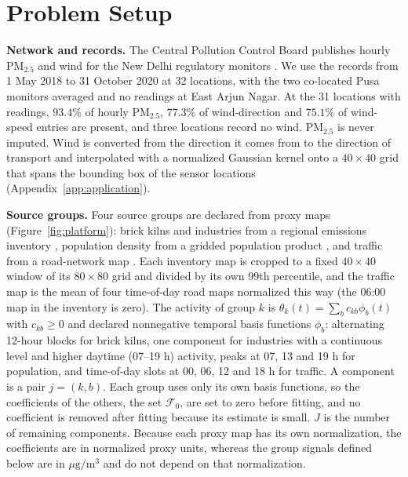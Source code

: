 \section{Problem Setup}
\label{sec:problem_setup}

\noindent\textbf{Network and records.}
The Central Pollution Control Board publishes hourly PM\(_{2.5}\) and wind for the New
Delhi regulatory monitors \citep{cpcb,cpcb_portal}.  We use
the records from 1 May 2018 to 31 October 2020 at 32 locations, with the two co-located
Pusa monitors averaged and no readings at East Arjun Nagar.  At the 31 locations with
readings, \(93.4\%\) of hourly PM\(_{2.5}\), \(77.3\%\) of wind-direction and \(75.1\%\) of
wind-speed entries are present, and three locations record no wind.  PM\(_{2.5}\) is never
imputed.  Wind is converted from the direction it comes
from to the direction of transport and interpolated with a normalized Gaussian
kernel onto a \(40\times40\) grid that spans the bounding box of the sensor locations
(Appendix~\ref{app:application}).

\noindent\textbf{Source groups.}
Four source groups are declared from proxy maps (Figure~\ref{fig:platform}): brick
kilns and industries from a
regional emissions inventory \citep{GUTTIKUNDA2013101}, population density from a
gridded population product \citep{ColumbiaUniversity2018}, and traffic from a
road-network map \citep{google_maps}.  Each inventory map is cropped to a fixed \(40\times40\)
window of its \(80\times80\) grid and divided by its own 99th percentile,
and the traffic map is the mean of four time-of-day road maps normalized this way (the
06:00 map in the inventory is zero).  The activity of group \(k\) is
\(\theta_k(t)=\sum_b c_{kb}\phi_b(t)\) with \(c_{kb}\ge0\) and declared nonnegative
temporal basis functions \(\phi_b\): alternating 12-hour blocks for brick kilns,
one component for industries with a continuous level and higher daytime (07--19 h)
activity, peaks at 07, 13 and 19 h
for population, and time-of-day slots at 00, 06, 12 and 18 h for traffic.  A component is
a pair \(j=(k,b)\).  Each group uses only its own basis functions, so the coefficients of the others, the
set \(\mathcal F_0\), are set to zero before fitting, and no coefficient is removed after
fitting because its estimate is small.  \(J\) is the number of remaining components.
Because each proxy map has its own normalization, the coefficients are in normalized
proxy units, whereas the group signals defined below are in
\(\mu\mathrm g/\mathrm m^3\) and do not depend on that normalization.

